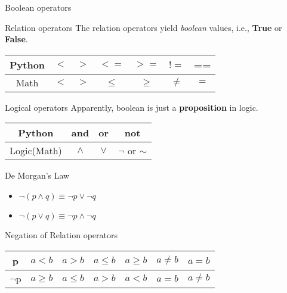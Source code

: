 \documentclass{beamer}
\begin{document}
\begin{frame}{Boolean operators}
    \begin{block}{Relation operators}
        The relation operators yield \textit{boolean} values, i.e., \textbf{True} or \textbf{False}.
        \begin{center}
            \begin{tabular}{|c|c|c|c|c|c|c|}
                \hline
                Python & $<$ & $>$ & $<=$  & $>=$  & $!=$  & ==  \\
                \hline
                Math   & $<$ & $>$ & $\le$ & $\ge$ & $\ne$ & $=$ \\
                \hline
            \end{tabular}
        \end{center}
    \end{block}

    \begin{block}{Logical operators}
        Apparently, boolean is just a \textbf{proposition} in logic.
        \begin{center}
            \begin{tabular}{|c|c|c|c|}
                \hline
                Python      & \textbf{and} & \textbf{or} & \textbf{not}     \\
                \hline
                Logic(Math) & $\land$      & $\lor$      & $\neg$ or $\sim$ \\
                \hline
            \end{tabular}
        \end{center}
    \end{block}

\end{frame}

\begin{frame}
    \begin{block}{De Morgan's Law}
        \begin{itemize}
            \item $\neg(p \land q) \equiv \neg p \lor \neg q$
            \item $\neg(p \lor q) \equiv \neg p \land \neg q$
        \end{itemize}
    \end{block}
    \begin{block}{Negation of Relation operators}
        \begin{center}
            \begin{tabular}{|c|c|c|c|c|c|c|}
                \hline
                p       & $a<b$    & $a>b$    & $a \le b$ & $a\ge b$ & $a\ne b$ & $a=b$    \\
                \hline
                $\neg$p & $a\ge b$ & $a\le b$ & $a>b$     & $a<b$    & $a=b$    & $a\ne b$ \\
                \hline
            \end{tabular}
        \end{center}
    \end{block}
\end{frame}
\end{document}
